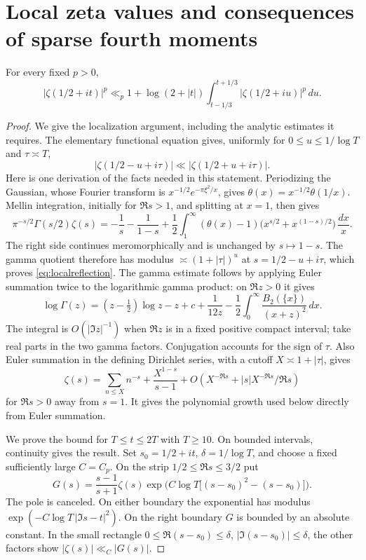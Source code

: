 \section{Local zeta values and consequences of sparse fourth moments}\label{app:localzeta}

\begin{proposition}\label{prop:localzetaproof}
For every fixed $p>0$,
\begin{equation}\label{eq:baselocal}
 |\zeta(1/2+it)|^p\ll_p
 1+\log(2+|t|)\int_{t-1/3}^{t+1/3}|\zeta(1/2+iu)|^p\,du.
\end{equation}
\end{proposition}
\begin{proof}
We give the localization argument, including the analytic estimates it
requires. The elementary functional equation gives, uniformly for
$0\le u\le1/\log T$ and $\tau\asymp T$,
\begin{equation}\label{eq:localreflection}
 |\zeta(1/2-u+i\tau)|\ll |\zeta(1/2+u+i\tau)|.
\end{equation}
Here is one derivation of the facts needed in this statement. Periodizing
the Gaussian, whose Fourier transform is $x^{-1/2}e^{-\pi\xi^2/x}$,
gives $\theta(x)=x^{-1/2}\theta(1/x)$. Mellin integration, initially
for $\Re s>1$, and splitting at $x=1$, then gives
\[
 \pi^{-s/2}\Gamma(s/2)\zeta(s)
 =-\frac1s-\frac1{1-s}
 +\frac12\int_1^\infty(\theta(x)-1)
       \bigl(x^{s/2}+x^{(1-s)/2}\bigr)\,\frac{dx}{x}.
\]
The right side continues meromorphically and is unchanged by
$s\mapsto1-s$. The gamma quotient therefore has modulus
$\asymp(1+|\tau|)^u$ at $s=1/2-u+i\tau$, which proves
\eqref{eq:localreflection}. The gamma estimate follows
by applying Euler summation twice to the logarithmic gamma product:
on $\Re z>0$ it gives
\[
 \log\Gamma(z)=(z-\tfrac12)\log z-z+c+\frac1{12z}
 -\frac12\int_0^\infty\frac{B_2(\{x\})}{(x+z)^2}\,dx.
\]
The integral is $O(|\Im z|^{-1})$ when $\Re z$ is in a fixed positive
compact interval; take real parts in the two gamma factors.
Conjugation accounts for the sign of $\tau$. Also Euler summation in
the defining Dirichlet series, with a cutoff $X\asymp1+|\tau|$, gives
\[
 \zeta(s)=\sum_{n\le X}n^{-s}+\frac{X^{1-s}}{s-1}
          +O(X^{-\Re s}+|s|X^{-\Re s}/\Re s)
\]
for $\Re s>0$ away from $s=1$. It gives the polynomial growth used
below directly from Euler summation.

We prove the bound for $T\le t\le2T$ with $T\ge10$. On bounded intervals, continuity gives the result.
Set $s_0=1/2+it$, $\delta=1/\log T$, and choose a fixed sufficiently
large $C=C_p$. On the strip $1/2\le\Re s\le3/2$ put
\[
 G(s)=\frac{s-1}{s+1}\zeta(s)
 \exp\bigl(C\log T\bigl[(s-s_0)^2-(s-s_0)\bigr]\bigr).
\]
The pole is canceled. On either boundary the exponential has modulus
$\exp(-C\log T\,|\Im s-t|^2)$. On the right boundary $G$ is bounded
by an absolute constant. In the small rectangle
$0\le\Re(s-s_0)\le\delta$, $|\Im(s-s_0)|\le\delta$,
the other factors show $|\zeta(s)|\ll_C|G(s)|$.


\end{proof}
